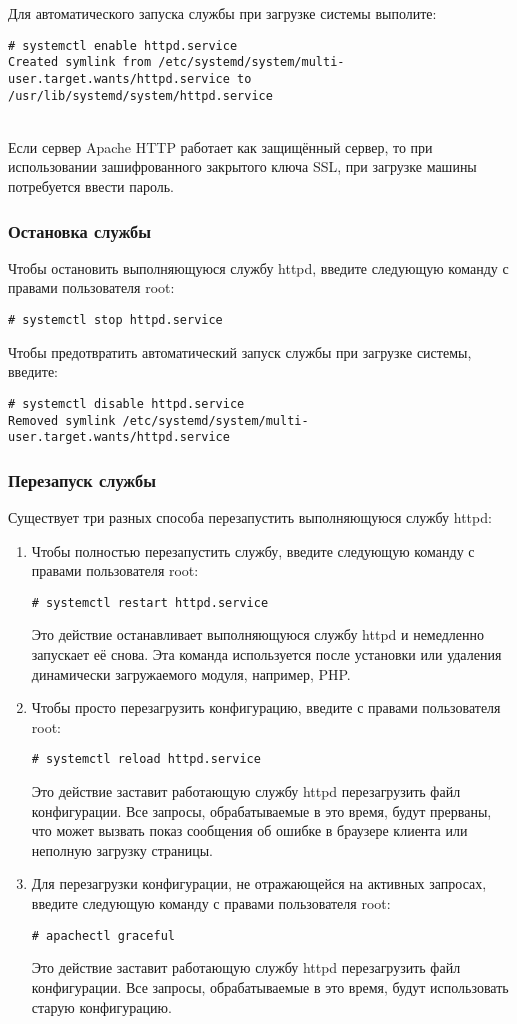 \documentclass[a4paper,10pt,twoside]{article}
\begin{document}
Для автоматического запуска службы при загрузке системы выполите:
\begin{verbatim}
# systemctl enable httpd.service
Created symlink from /etc/systemd/system/multi-user.target.wants/httpd.service to /usr/lib/systemd/system/httpd.service
\end{verbatim} 


\\
Если сервер Apache HTTP работает как защищённый сервер, то при использовании зашифрованного закрытого ключа SSL, при загрузке машины потребуется ввести пароль.



\subsubsection{Остановка службы}
Чтобы остановить выполняющуюся службу httpd, введите следующую команду с правами пользователя root: 
\begin{verbatim}
# systemctl stop httpd.service
\end{verbatim} 

Чтобы предотвратить автоматический запуск службы при загрузке системы, введите:
\begin{verbatim}
# systemctl disable httpd.service
Removed symlink /etc/systemd/system/multi-user.target.wants/httpd.service
\end{verbatim}


\subsubsection{Перезапуск службы}
Существует три разных способа перезапустить выполняющуюся службу httpd:

\begin{enumerate}
 \item Чтобы полностью перезапустить службу, введите следующую команду с правами пользователя root: 
\begin{verbatim}
# systemctl restart httpd.service
\end{verbatim} 
Это действие останавливает выполняющуюся службу httpd и немедленно запускает её снова. Эта команда используется после установки или удаления динамически загружаемого модуля, например, PHP.
\item Чтобы просто перезагрузить конфигурацию, введите с правами пользователя root: 
\begin{verbatim}
# systemctl reload httpd.service
\end{verbatim} 
Это действие заставит работающую службу httpd перезагрузить файл конфигурации. Все запросы, обрабатываемые в это время, будут прерваны, что может вызвать показ сообщения об ошибке в браузере клиента или неполную загрузку страницы.
\item Для перезагрузки конфигурации, не отражающейся на активных запросах, введите следующую команду с правами пользователя root: 
\begin{verbatim}
# apachectl graceful\end{verbatim} 
Это действие заставит работающую службу httpd перезагрузить файл конфигурации. Все запросы, обрабатываемые в это время, будут использовать старую конфигурацию.
\end{enumerate}
\end{document}
